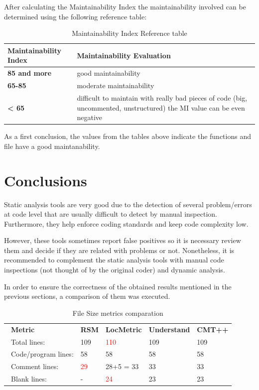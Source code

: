 After calculating the Maintainability Index the maintainability involved can be determined using the following reference table:

{\footnotesize\sffamily\centering
  \begin{longtable}{||p{}|p{}||}
  \caption{Maintainability Index Reference table}\\
    \hline\hline
    \textbf{Maintainability Index} & \textbf{Maintainability Evaluation} \\
    \hline\hline
    \endhead
    \hline\hline
    \endfoot
    \textbf{85 and more}
& good maintainability
    \\
    \hline
    \textbf{65-85}
& moderate maintainability
    \\
    \hline
    \textbf{< 65}
& difficult to maintain
with really bad pieces of code (big, uncommented, unstructured) the MI value can be even negative
    \\
    \hline
\end{longtable}}

As a first conclusion, the values from the tables above indicate the functions and file have a good maintanability.

\section{Conclusions}

Static analysis tools are very good due to the detection of several problem/errors at code level that are usually difficult to detect by manual inspection. Furthermore, they help enforce coding standards and keep code complexity low.

However, these tools sometimes report false positives so it is necessary review them and decide if they are related with problems or not. Nonetheless, it is recommended to complement the static analysis tools with manual code inspections (not thought of by the original coder) and dynamic analysis.

In order to ensure the correctness of the obtained results mentioned in the previous sections, a comparison of them was executed.

\begin{longtable}{||p{}|p{}|p{}|p{}|p{}||}
  \caption{File Size metrics comparation}\\
    \hline\hline
    \endhead
    \hline\hline
    \endfoot
\multicolumn{5}{||l||}{\textbf{Bitwalker.c}}
\\\hline
\ \textbf{Metric} & \textbf{RSM} & \textbf{LocMetric} & \textbf{Understand} & \textbf{CMT++}
\\\hline
\ Total lines: & 109 & \textcolor{red}{110} & 109 & 109
\\\hline
\ Code/program lines: & 58 & 58 & 58 & 58
\\\hline
\ Comment lines: & \textcolor{red}{29} & 28+5 = 33 & 33 & 33 
\\\hline
\ Blank lines: & - & \textcolor{red}{24} & 23 & 23
 \\\hline
\end{longtable}

